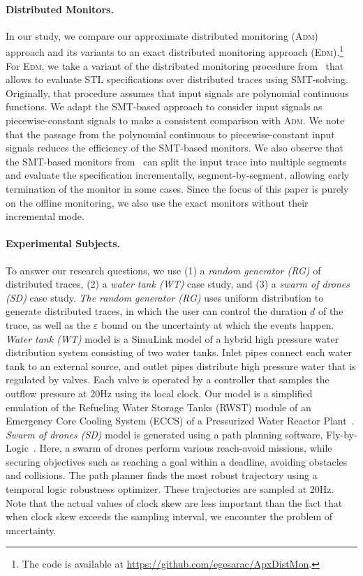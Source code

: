 \paragraph*{Distributed Monitors.}
In our study, we compare our approximate distributed monitoring (\textsc{Adm}) approach and its variants to an exact distributed monitoring approach (\textsc{Edm}).\footnote[1]{The code is available at \url{https://github.com/egesarac/ApxDistMon}.}
For \textsc{Edm}, we take a variant of the distributed monitoring procedure from~\cite{MomtazAB23} that allows to evaluate STL specifications over distributed traces using SMT-solving.
Originally, that procedure assumes that input signals are polynomial continuous functions.
We adapt the SMT-based approach to consider input signals as piecewise-constant signals to make a consistent comparison with \textsc{Adm}.
We note that the passage from the polynomial continuous to piecewise-constant input signals reduces the efficiency of the SMT-based monitors.
We also observe that the SMT-based monitors from~\cite{MomtazAB23} can split the input trace into multiple segments and evaluate the specification incrementally, segment-by-segment, allowing early termination of the monitor in some cases.
Since the focus of this paper is purely on the offline monitoring, we also use the exact monitors without their incremental mode.


\paragraph*{Experimental Subjects.}
To answer our research questions, we use (1) a \emph{random generator (RG)} of distributed traces, (2) a \emph{water tank (WT)} case study, and (3) a \emph{swarm of drones (SD)} case study.  
%
\emph{The random generator (RG)} uses uniform distribution to generate distributed traces, in which the user can control the duration $d$ of the trace, as well as the $\varepsilon$ bound on the uncertainty at which the events happen.
\emph{Water tank (WT)} model is a SimuLink model of a hybrid high pressure water distribution system consisting of two water tanks. Inlet pipes connect each water tank to an external source, and outlet pipes distribute high pressure water that is regulated by valves.
Each valve is operated by a controller that samples the outflow pressure at 20Hz using its local clock. Our model is a simplified emulation of the Refueling Water Storage Tanks (RWST) module of an Emergency Core Cooling System (ECCS) of a Pressurized Water Reactor Plant~\cite{USNRCPWR}.
\emph{Swarm of drones (SD)} model is generated using a path planning software, Fly-by-Logic~\cite{PantAM17CCTA}. Here, a swarm of drones perform various reach-avoid missions, while securing objectives such as reaching a goal within a deadline, avoiding obstacles and collisions. The path planner finds the most robust trajectory using a temporal logic robustness optimizer. These trajectories are sampled at 20Hz.
Note that the actual values of clock skew are less important than the fact that when clock skew exceeds the sampling interval, we encounter the problem of uncertainty.

